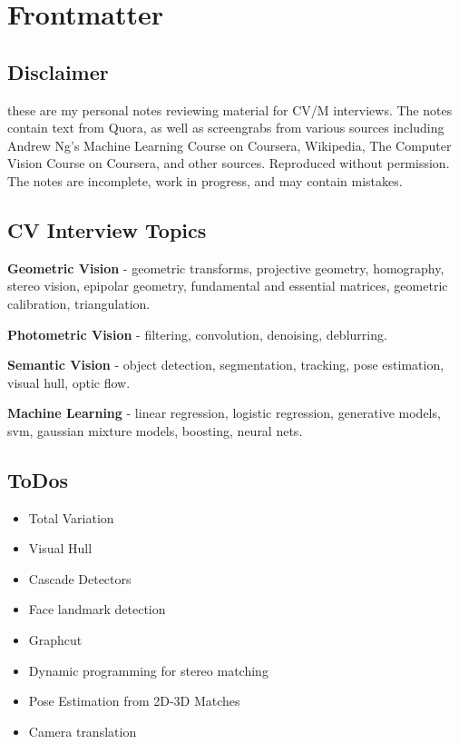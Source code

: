 \chapter{Frontmatter}
\label{chap:frontmatter}

\section{Disclaimer}

these are my personal notes reviewing material for CV/M interviews. The notes contain text from Quora, as well as screengrabs from various sources including Andrew Ng's Machine Learning Course on Coursera, Wikipedia, The Computer Vision Course on Coursera, and other sources. Reproduced without permission. The notes are incomplete, work in progress, and may contain mistakes.

\section{CV Interview Topics}

\textbf{Geometric Vision} - geometric transforms, projective geometry, homography, stereo vision, epipolar geometry, fundamental and essential matrices, geometric calibration, triangulation.

\textbf{Photometric Vision} - filtering, convolution, denoising, deblurring.

\textbf{Semantic Vision} - object detection, segmentation, tracking, pose estimation, visual hull, optic flow.

\textbf{Machine Learning} - linear regression, logistic regression, generative models, svm, gaussian mixture models, boosting, neural nets.

\section{ToDos}
\begin{itemize}
\item Total Variation
\item Visual Hull
\item Cascade Detectors
\item Face landmark detection
\item Graphcut
\item Dynamic programming for stereo matching
\item Pose Estimation from 2D-3D Matches
\item Camera translation
\end{itemize}
